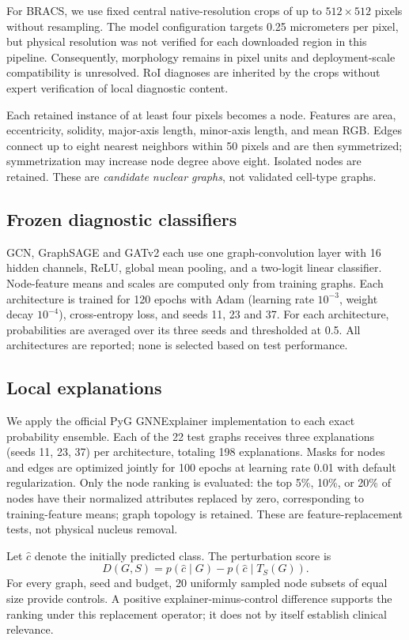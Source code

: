 \documentclass[11pt,a4paper]{article}
\begin{document}
For BRACS, we use fixed central native-resolution crops of up to $512\times512$ pixels without resampling. The model configuration targets 0.25 micrometers per pixel, but physical resolution was not verified for each downloaded region in this pipeline. Consequently, morphology remains in pixel units and deployment-scale compatibility is unresolved. RoI diagnoses are inherited by the crops without expert verification of local diagnostic content.

Each retained instance of at least four pixels becomes a node. Features are area, eccentricity, solidity, major-axis length, minor-axis length, and mean RGB. Edges connect up to eight nearest neighbors within 50 pixels and are then symmetrized; symmetrization may increase node degree above eight. Isolated nodes are retained. These are \emph{candidate nuclear graphs}, not validated cell-type graphs.

\subsection{Frozen diagnostic classifiers}
GCN, GraphSAGE and GATv2 each use one graph-convolution layer with 16 hidden channels, ReLU, global mean pooling, and a two-logit linear classifier. Node-feature means and scales are computed only from training graphs. Each architecture is trained for 120 epochs with Adam (learning rate $10^{-3}$, weight decay $10^{-4}$), cross-entropy loss, and seeds 11, 23 and 37. For each architecture, probabilities are averaged over its three seeds and thresholded at 0.5. All architectures are reported; none is selected based on test performance.

\subsection{Local explanations}
We apply the official PyG GNNExplainer implementation to each exact probability ensemble. Each of the 22 test graphs receives three explanations (seeds 11, 23, 37) per architecture, totaling 198 explanations. Masks for nodes and edges are optimized jointly for 100 epochs at learning rate 0.01 with default regularization. Only the node ranking is evaluated: the top 5\%, 10\%, or 20\% of nodes have their normalized attributes replaced by zero, corresponding to training-feature means; graph topology is retained. These are feature-replacement tests, not physical nucleus removal.

Let $\hat c$ denote the initially predicted class. The perturbation score is
\begin{equation}
D(G,S)=p(\hat c\mid G)-p(\hat c\mid T_S(G)).
\end{equation}
For every graph, seed and budget, 20 uniformly sampled node subsets of equal size provide controls. A positive explainer-minus-control difference supports the ranking under this replacement operator; it does not by itself establish clinical relevance.
\end{document}
